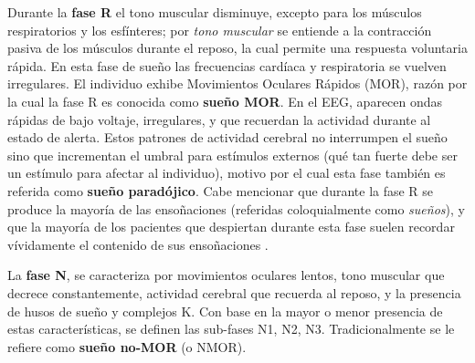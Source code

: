 \documentclass[12pt,letterpaper]{book}
\begin{document}
Durante la \textbf{fase R} el tono muscular disminuye, excepto para los músculos respiratorios y 
los esfínteres;
%
por \textit{tono muscular} se entiende a la contracción pasiva de los músculos durante el reposo, la cual permite una respuesta voluntaria rápida.
%
En esta fase de sueño las frecuencias cardíaca y respiratoria se vuelven irregulares. 
%
El individuo exhibe Movimientos Oculares Rápidos (MOR), razón por la cual la fase R es conocida como \textbf{sueño MOR}.
%
En el EEG, aparecen ondas rápidas de bajo voltaje, irregulares, y que recuerdan la actividad durante al estado de alerta. 
%
Estos patrones de actividad cerebral no interrumpen el sueño sino que incrementan el umbral para estímulos externos (qué tan fuerte debe ser un estímulo para afectar al individuo), motivo por el cual esta fase también es referida como \textbf{sueño paradójico}.
%
Cabe mencionar que durante la fase R se produce la mayoría de las ensoñaciones (referidas coloquialmente como \textit{sueños}), y que la mayoría de los pacientes que despiertan durante esta fase suelen recordar vívidamente el contenido de sus ensoñaciones \cite{Rosales14}.

%
La \textbf{fase N}, se caracteriza por movimientos oculares lentos, tono muscular que decrece 
constantemente, actividad cerebral que recuerda al reposo, y la presencia de husos de sueño y 
complejos K. 
%
Con base en la mayor o menor presencia de estas características, se definen las sub-fases N1, N2, N3.
%
Tradicionalmente se le refiere como \textbf{sueño no-MOR} (o NMOR).
\end{document}
